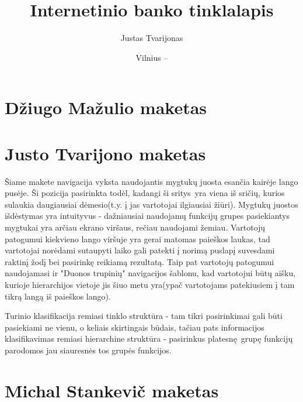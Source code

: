\documentclass{VUMIFPSkursinis}
\title{Internetinio banko tinklalapis}
\author{Justas Tvarijonas}
\date{Vilnius – \the\year}
\begin{document}
\maketitle
\tableofcontents
\section{Džiugo Mažulio maketas}
\section{Justo Tvarijono maketas}
Šiame makete navigacija vyksta naudojantis mygtukų juosta esančia kairėje lango pusėje. Ši pozicija pasirinkta todėl, kadangi ši sritys yra viena iš sričių, kurios sulaukia daugiausiai dėmesio(t.y. į jas vartotojai ilgiausiai žiūri). Mygtukų juostos išdėstymas yra intuityvus - dažniausiai naudojamų funkcijų grupes pasiekiantys mygtukai yra arčiau ekrano viršaus, rečiau naudojami žemiau. Vartotojų patogumui kiekvieno lango viršuje yra gerai matomas paieškos laukas, tad vartotojai norėdami sutaupyti laiko gali patekti į norimą puslapį suvesdami raktinį žodį bei pasirinkę reikiamą rezultatą. Taip pat vartotojų patogumui naudojamasi ir "Duonos trupinių" navigacijos šablonu, kad vartotojui būtų aišku, kurioje hierarchijos vietoje jis šiuo metu yra(ypač vartotojams patekiusiem į tam tikrą langą iš paieškos lango). \par Turinio klasifikacija remiasi tinklo struktūra - tam tikri pasirinkimai gali būti pasiekiami ne vienu, o keliais skirtingais būdais, tačiau pats informacijos klasifikavimas remiasi hierarchine struktūra - pasirinkus platesnę grupę funkcijų parodomos jau siauresnės tos grupės funkcijos.

\section{Michal Stankevič maketas}
\end{document}
